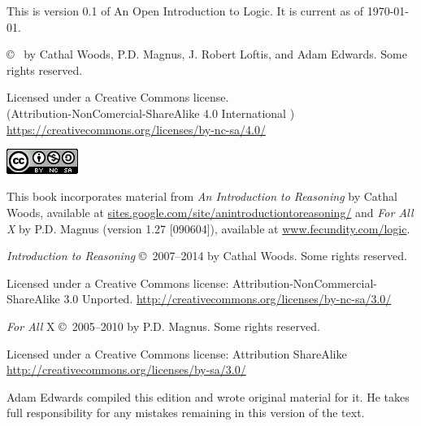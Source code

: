 \thispagestyle{empty}%
This is version 0.1 of An Open Introduction to Logic. It is current as of \today. %

\vfill

{\copyright\  by Cathal Woods, P.D. Magnus, J. Robert Loftis, and Adam Edwards. Some rights reserved. }

\begin{adjustwidth}{2em}{0em}
{\footnotesize Licensed under a Creative Commons license.\\
	(Attribution-NonComercial-ShareAlike 4.0 International )
	\url{https://creativecommons.org/licenses/by-nc-sa/4.0/}


\includegraphics[width=66pt, height=23pt, keepaspectratio=true]{img/cc-by-nc-sa.png}

}

\end{adjustwidth}

\vfill

This book incorporates material from \emph{An Introduction to Reasoning} by Cathal Woods, available at \url{sites.google.com/site/anintroductiontoreasoning/}
and \emph{For All X} by P.D. Magnus (version 1.27 [090604]), available at \url{www.fecundity.com/logic}.


\textit{Introduction to Reasoning} \copyright\ 2007--2014 by Cathal Woods. Some rights reserved.

\begin{adjustwidth}{2em}{0em}
{\footnotesize Licensed under a Creative Commons license: Attribution-NonCommercial-ShareAlike 3.0 Unported. \url{http://creativecommons.org/licenses/by-nc-sa/3.0/}}
\end{adjustwidth}

\textit{For All} X \copyright\  2005--2010 by P.D. Magnus. Some rights reserved.

\begin{adjustwidth}{2em}{0em}
{\footnotesize Licensed under a Creative Commons license: Attribution ShareAlike \url{http://creativecommons.org/licenses/by-sa/3.0/}}
\end{adjustwidth}

\vfill

Adam Edwards compiled this edition and wrote original material for it. He takes full responsibility for any mistakes remaining in this version of the text.


